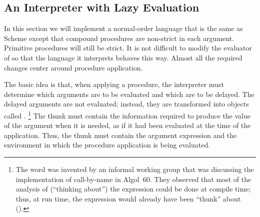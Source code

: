 \subsection{An Interpreter with Lazy Evaluation}
\label{Section 4.2.2}

In this section we will implement a normal-order language that is the same as Scheme except that compound procedures are non-strict in each argument.
Primitive procedures will still be strict.
It is not difficult to modify the evaluator of  so that the language it interprets behaves this way.
Almost all the required changes center around procedure application.

The basic idea is that, when applying a procedure, the interpreter must determine which arguments are to be evaluated and which are to be delayed.
The delayed arguments are not evaluated;
instead, they are transformed into objects called .%
\footnote{
	The word  was invented by an informal working group that was discussing the implementation of call-by-name in Algol~60.
	They observed that most of the analysis of (“thinking about”) the expression could be done at compile time;
	thus, at run time, the expression would already have been “thunk” about ().
}
The thunk must contain the information required to produce the value of the argument when it is needed, as if it had been evaluated at the time of the application.
Thus, the thunk must contain the argument expression and the environment in which the procedure application is being evaluated.

